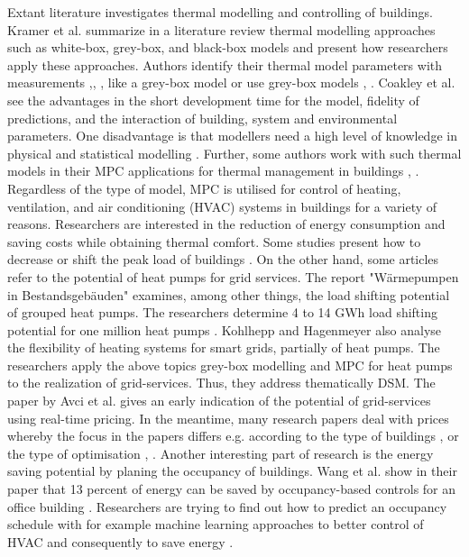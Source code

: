     Extant literature investigates thermal modelling and controlling of buildings. Kramer et al. \cite{Kramer.2012} summarize in a literature review thermal modelling approaches such as white-box, grey-box, and black-box models and present how researchers apply these approaches. Authors identify their thermal model parameters with measurements \cite{Siroky.2011},\cite{Hazyuk.2012}, \cite{Park.2011}, like a grey-box model or use grey-box models \cite{Freund.2020}, \cite{EvelynSperber.2019}. Coakley et al. \cite{Coakley.2014} see the advantages in the short development time for the model, fidelity of predictions, and the interaction of building, system and environmental parameters. One disadvantage is that modellers need a high level of knowledge in physical and statistical modelling \cite{Coakley.2014}.
    \newline
    Further, some authors work with such thermal models in their MPC applications for thermal management in buildings \cite{JiriCigler.}, \cite{Hazyuk.2012b}. 
    \newline
    Regardless of the type of model, MPC is utilised for control of heating, ventilation, and air conditioning (HVAC)  systems in buildings for a variety of reasons. Researchers are interested in the reduction of energy consumption \cite{Hazyuk.2012b} and saving costs \cite{Zwickel.2019} while obtaining thermal comfort. Some studies present how to decrease or shift the peak load of buildings \cite{Oldewurtel.2010}.
    \newline
    On the other hand, some articles refer to the potential of heat pumps for grid services.
    The report "Wärmepumpen in Bestandsgebäuden" examines, among other things, the load shifting potential of grouped heat pumps. The researchers determine 4 to 14 GWh load shifting potential for one million heat pumps \cite{WPimBestand.2020}.
    Kohlhepp and Hagenmeyer \cite{Kohlhepp.2017} also analyse the flexibility of heating systems for smart grids, partially of heat pumps. 
    \newline
    The researchers apply the above topics grey-box modelling and MPC for heat pumps to the realization of grid-services. Thus, they address thematically DSM. The paper by Avci et al. \cite{Avci.2013} gives an early indication of the potential of grid-services using real-time pricing. In the meantime, many research papers deal with prices whereby the focus in the papers differs e.g. according to the type of buildings \cite{Bianchini.2019}, \cite{Kim.2018} or the type of optimisation \cite{Bianchini.2019}, \cite{Bianchini.2016}.\newline 
    Another interesting part of research is the energy saving potential by planing the occupancy of buildings. Wang et al. show in their paper that 13 percent of energy can be saved by occupancy-based controls for an office building \cite{Wang.2019}. Researchers are trying to find out how to predict an occupancy schedule with for example machine learning approaches to better control of HVAC and consequently to save energy \cite{Liang.2016}.\newline
    

